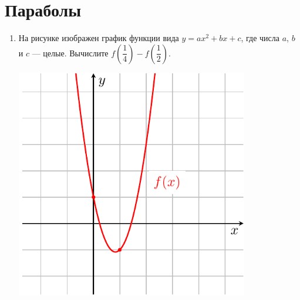 \documentclass[10pt, a4paper]{article}
\begin{document}
\section{Параболы}
\begin{enumerate}
	\item
	\begin{minipage}[t][8cm][t]{0.5\textwidth}
		На рисунке изображен график функции вида $y=ax^2+bx+c$, где числа $a$, $b$ и $c$ — целые. Вычислите $f\left(\dfrac{1}{4}\right)-f\left(\dfrac{1}{2}\right)$.
		\begin{flushright}
		\end{flushright}
	\end{minipage}
	\begin{minipage}[t][8cm][t]{0.5\textwidth}
		\hspace{10pt}
		\includegraphics[align=t, width=0.8\textwidth]{graphs/graph_1/graph_1}
	\end{minipage}
\end{enumerate}
\end{document}
